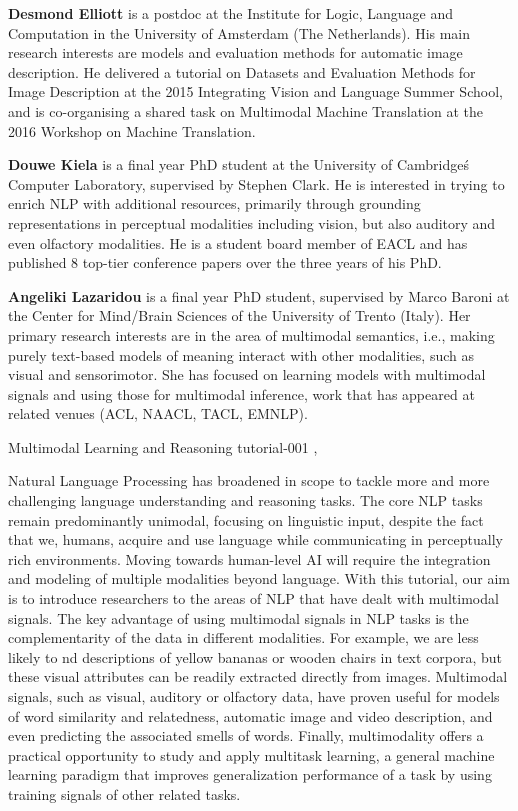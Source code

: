\begin{bio}
  {\bfseries Desmond Elliott} is a postdoc at the Institute for Logic, Language and Computation in the University of Amsterdam (The Netherlands). His main research interests are models and evaluation methods for automatic image description. He delivered a tutorial on Datasets and Evaluation Methods for Image Description at the 2015 Integrating Vision and Language Summer School, and is co-organising a shared task on Multimodal Machine Translation at the 2016 Workshop on Machine Translation.

  {\bfseries Douwe Kiela} is a final year PhD student at the University of Cambridge\'s Computer Laboratory, supervised by Stephen Clark. He is interested in trying to enrich NLP with additional resources, primarily through grounding representations in perceptual modalities including vision, but also auditory and even olfactory modalities. He is a student board member of EACL and has published 8 top-tier conference papers over the three years of his PhD.

  {\bfseries Angeliki Lazaridou} is a final year PhD student, supervised by Marco Baroni at the Center for Mind/Brain Sciences of the University of Trento (Italy). Her primary research interests are in the area of multimodal semantics, i.e., making purely text-based models of meaning interact with other modalities, such as visual and sensorimotor. She has focused on learning models with multimodal signals and using those for multimodal inference, work that has appeared at related venues (ACL, NAACL, TACL, EMNLP).
\end{bio}

\begin{tutorial}
  {Multimodal Learning and Reasoning}
  {tutorial-001}
  {\daydateyear, \tutorialmorningtime}
  {\TutLocA}

Natural Language Processing has broadened in scope to tackle more and more challenging language understanding and reasoning tasks. The core NLP tasks remain predominantly unimodal, focusing on linguistic input, despite the fact that we, humans, acquire and use language while communicating in perceptually rich environments. Moving towards human-level AI will require the integration and modeling of multiple modalities beyond language. With this tutorial, our aim is to introduce researchers to the areas of NLP that have dealt with multimodal signals. The key advantage of using multimodal signals in NLP tasks is the complementarity of the data in different modalities. For example, we are less likely to nd descriptions of yellow bananas or wooden chairs in text corpora, but these visual attributes can be readily extracted directly from images. Multimodal signals, such as visual, auditory or olfactory data, have proven useful for models of word similarity and relatedness, automatic image and video description, and even predicting the associated smells of words. Finally, multimodality offers a practical opportunity to study and apply multitask learning, a general machine learning paradigm that improves generalization performance of a task by using training signals of other related tasks.

\end{tutorial}
